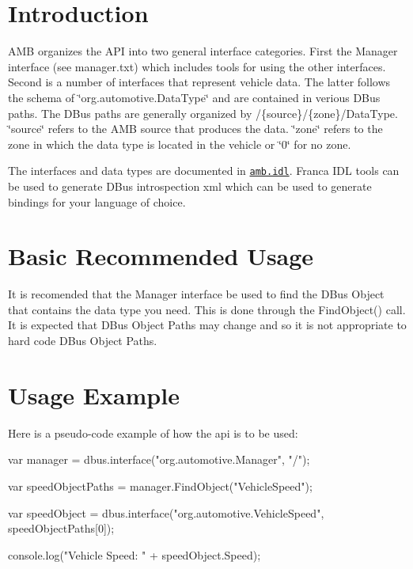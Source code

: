 \hypertarget{index_intro}{}\section{Introduction}\label{index_intro}
A\-M\-B organizes the A\-P\-I into two general interface categories. First the Manager interface (see manager.\-txt) which includes tools for using the other interfaces. Second is a number of interfaces that represent vehicle data. The latter follows the schema of \char`\"{}org.\-automotive.\-Data\-Type\char`\"{} and are contained in verious D\-Bus paths. The D\-Bus paths are generally organized by /\{source\}/\{zone\}/\-Data\-Type. \char`\"{}source\char`\"{} refers to the A\-M\-B source that produces the data. \char`\"{}zone\char`\"{} refers to the zone in which the data type is located in the vehicle or \char`\"{}0\char`\"{} for no zone.

The interfaces and data types are documented in \href{amb.idl}{\tt amb.\-idl}. Franca I\-D\-L tools can be used to generate D\-Bus introspection xml which can be used to generate bindings for your language of choice.\hypertarget{index_basic_usage}{}\section{Basic Recommended Usage}\label{index_basic_usage}
It is recomended that the Manager interface be used to find the D\-Bus Object that contains the data type you need. This is done through the Find\-Object() call. It is expected that D\-Bus Object Paths may change and so it is not appropriate to hard code D\-Bus Object Paths.\hypertarget{index_example}{}\section{Usage Example}\label{index_example}
Here is a pseudo-\/code example of how the api is to be used\-:


\begin{DoxyCode}
var manager = dbus.interface(\textcolor{stringliteral}{"org.automotive.Manager"}, \textcolor{stringliteral}{"/"});

var speedObjectPaths = manager.FindObject(\textcolor{stringliteral}{"VehicleSpeed"});

var speedObject = dbus.interface(\textcolor{stringliteral}{"org.automotive.VehicleSpeed"}, speedObjectPaths[0]);

console.log(\textcolor{stringliteral}{"Vehicle Speed: "} + speedObject.Speed);
\end{DoxyCode}
 